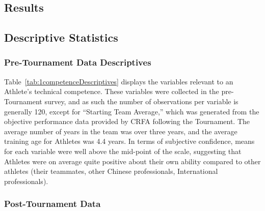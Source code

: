 \begin{CJK}{UTF8}{gbsn}
\section{Results\label{app8:results}}



\subsection{Descriptive Statistics}

\subsubsection{Pre-Tournament Data Descriptives \label{app8:descriptivesPre}}



Table~\ref{tab:1competenceDescriptives} displays the variables relevant to an Athlete's technical competence.  These variables were collected in the pre-Tournament survey, and as such the number of observations per variable is generally 120, except for ``Starting Team Average,'' which was generated from the objective performance data provided by CRFA following the Tournament.  The average number of years in the team was over three years, and the average training age for Athletes was 4.4 years.  In terms of subjective confidence, means for each variable were well above the mid-point of the scale, suggesting that Athletes were on average quite positive about their own ability compared to other athletes (their teammates, other Chinese professionals, International professionals).




\subsubsection{Post-Tournament Data}

%
%
%
%


%
%
%






\end{CJK}
